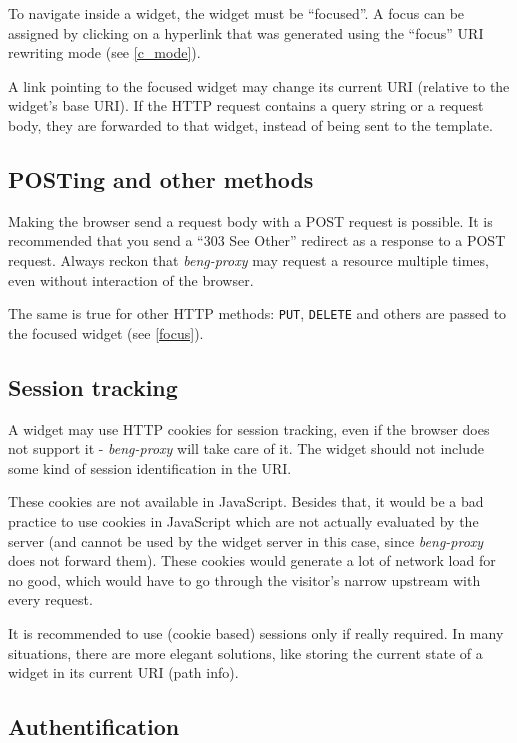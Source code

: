 \documentclass[a4paper,12pt]{article}
\begin{document}
To navigate inside a widget, the widget must be ``focused''.  A focus
can be assigned by clicking on a hyperlink that was generated using
the ``focus'' URI rewriting mode (see \ref{c_mode}).

A link pointing to the focused widget may change its current URI
(relative to the widget's base URI).  If the HTTP request contains a
query string or a request body, they are forwarded to that widget,
instead of being sent to the template.

\subsection{POSTing and other methods}

Making the browser send a request body with a POST request is
possible.  It is recommended that you send a ``303 See Other''
redirect as a response to a POST request.  Always reckon that
\emph{beng-proxy} may request a resource multiple times, even without
interaction of the browser.

The same is true for other HTTP methods: \texttt{PUT}, \texttt{DELETE}
and others are passed to the focused widget (see \ref{focus}).

\subsection{Session tracking}

A widget may use HTTP cookies for session tracking, even if the
browser does not support it - \emph{beng-proxy} will take care of it.
The widget should not include some kind of session identification in
the URI.

These cookies are not available in JavaScript.  Besides that, it would
be a bad practice to use cookies in JavaScript which are not actually
evaluated by the server (and cannot be used by the widget server in
this case, since \emph{beng-proxy} does not forward them).  These
cookies would generate a lot of network load for no good, which would
have to go through the visitor's narrow upstream with every request.

It is recommended to use (cookie based) sessions only if really
required.  In many situations, there are more elegant solutions, like
storing the current state of a widget in its current URI (path info).

\subsection{Authentification}
\label{authentification}
\end{document}
